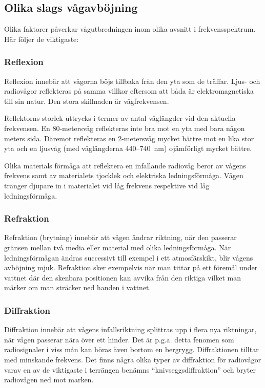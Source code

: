 \subsection{Olika slags vågavböjning}

Olika faktorer påverkar vågutbredningen inom olika avsnitt i
frekvensspektrum. Här följer de viktigaste:

\subsubsection{Reflexion}

Reflexion innebär att vågorna böjs tillbaka från den yta som de träffar.
Ljus- och radiovågor reflekteras på samma villkor eftersom
att båda är elektromagnetiska till sin natur.
Den stora skillnaden är vågfrekvensen.

Reflektorns storlek uttrycks i termer av antal våglängder vid den
aktuella frekvensen.
En 80-metersvåg reflekteras inte bra mot en yta med bara någon meters sida.
Däremot reflekteras en 2-metersvåg mycket bättre mot en lika stor yta och en
ljusvåg (med våglängderna 440--740~nm) ojämförligt mycket bättre.

Olika materials förmåga att reflektera en infallande radiovåg beror av
vågens frekvens samt av materialets tjocklek och elektriska ledningsförmåga.
Vågen tränger djupare in i materialet vid låg frekvens respektive vid låg
ledningsförmåga.

\subsubsection{Refraktion}

Refraktion (brytning) innebär att vågen ändrar riktning, när den
passerar gränsen mellan två media eller material med olika
ledningsförmåga. När ledningsförmågan ändras successivt till exempel i ett
atmosfärskikt, blir vågens avböjning mjuk. Refraktion sker exempelvis
när man tittar på ett föremål under vattnet där den skenbara
positionen kan avvika från den riktiga vilket man märker om man
sträcker ned handen i vattnet.

\subsubsection{Diffraktion}

Diffraktion innebär att vågens infallsriktning splittras upp i flera
nya riktningar, när vågen passerar nära över ett hinder.  Det är
p.g.a. detta fenomen som radiosignaler i viss mån kan höras även
bortom en bergrygg.
Diffraktionen tilltar med minskande frekvens. Det finns några olika
typer av diffraktion för radiovågor varav en av de viktigaste i
terrängen benämns ``knivseggsdiffraktion'' och bryter radiovågen ned
mot marken.
